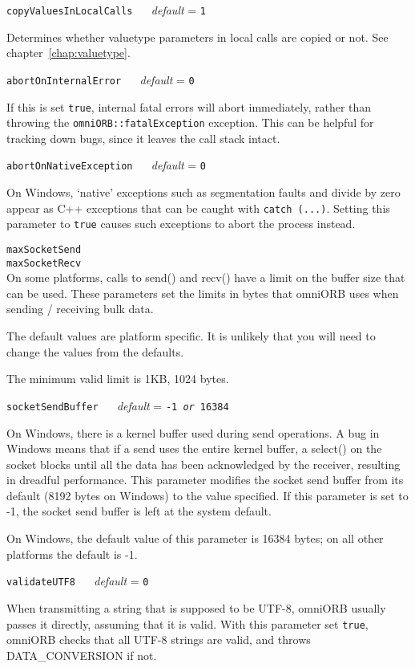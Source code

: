 \documentclass[11pt,oneside,a4paper]{book}
\makeatletter
\newcommand{\type}[1]{\texttt{#1}}
\newcommand{\code}[1]{\texttt{#1}}
\newcommand{\confopt}[2]
  {\vspace{\baselineskip}\par\noindent\code{#1} ~~ \textit{default} =
   \code{#2}}
\renewcommand{\confopt}[2]
  {\vspace{\baselineskip}\par\noindent\code{#1} ~~ \textit{default} =
   \code{#2}\\[-1ex]\@afterheading}
\makeatother
\begin{document}
\confopt{copyValuesInLocalCalls}{1}

Determines whether valuetype parameters in local calls are copied or
not. See chapter~\ref{chap:valuetype}.


\confopt{abortOnInternalError}{0}

If this is set \code{true}, internal fatal errors will abort
immediately, rather than throwing the \type{omniORB::fatalException}
exception.  This can be helpful for tracking down bugs, since it
leaves the call stack intact.

\confopt{abortOnNativeException}{0}

On Windows, `native' exceptions such as segmentation faults and divide
by zero appear as C++ exceptions that can be caught with \code{catch
  (...)}. Setting this parameter to \code{true} causes such exceptions
to abort the process instead.


\vspace{\baselineskip}\par
\noindent
\code{maxSocketSend}\\
\code{maxSocketRecv}\\[.1ex]

\noindent
On some platforms, calls to send() and recv() have a limit on the
buffer size that can be used. These parameters set the limits in bytes
that omniORB uses when sending / receiving bulk data.

The default values are platform specific. It is unlikely that you will
need to change the values from the defaults.

The minimum valid limit is 1KB, 1024 bytes.


\confopt{socketSendBuffer}{-1 \textit{or} 16384}

On Windows, there is a kernel buffer used during send operations.  A
bug in Windows means that if a send uses the entire kernel buffer, a
select() on the socket blocks until all the data has been acknowledged
by the receiver, resulting in dreadful performance. This parameter
modifies the socket send buffer from its default (8192 bytes on
Windows) to the value specified. If this parameter is set to -1, the
socket send buffer is left at the system default.

On Windows, the default value of this parameter is 16384 bytes; on all
other platforms the default is -1.


\confopt{validateUTF8}{0}

When transmitting a string that is supposed to be UTF-8, omniORB
usually passes it directly, assuming that it is valid. With this
parameter set \code{true}, omniORB checks that all UTF-8 strings are
valid, and throws DATA\_CONVERSION if not.
\end{document}
